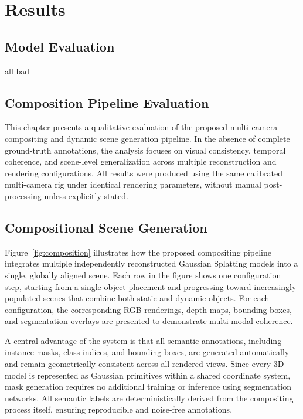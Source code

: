 \chapter{Results}


\section{Model Evaluation}


all bad




\section{Composition Pipeline Evaluation}

This chapter presents a qualitative evaluation of the proposed multi-camera compositing and dynamic scene generation pipeline. 
In the absence of complete ground-truth annotations, the analysis focuses on visual consistency, temporal coherence, and scene-level generalization across multiple reconstruction and rendering configurations. 
All results were produced using the same calibrated multi-camera rig under identical rendering parameters, without manual post-processing unless explicitly stated.

\section{Compositional Scene Generation}
Figure~\ref{fig:composition} illustrates how the proposed compositing pipeline integrates multiple independently reconstructed Gaussian Splatting models into a single, globally aligned scene. 
Each row in the figure shows one configuration step, starting from a single-object placement and progressing toward increasingly populated scenes that combine both static and dynamic objects.
For each configuration, the corresponding RGB renderings, depth maps, bounding boxes, and segmentation overlays are presented to demonstrate multi-modal coherence.

A central advantage of the system is that all semantic annotations, including instance masks, class indices, and bounding boxes, are generated automatically and remain geometrically consistent across all rendered views. 
Since every 3D model is represented as Gaussian primitives within a shared coordinate system, mask generation requires no additional training or inference using segmentation networks. 
All semantic labels are deterministically derived from the compositing process itself, ensuring reproducible and noise-free annotations.

